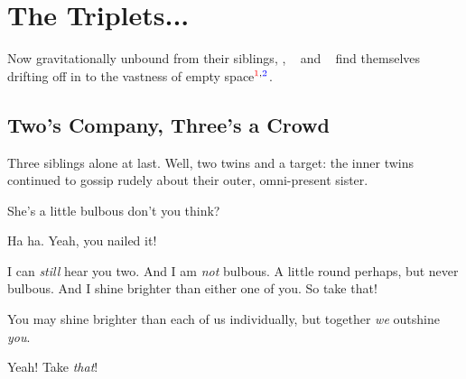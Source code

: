 \documentclass[main.tex]{subfiles}
\begin{document}
\chapter{The Triplets...}


 
\par \nar Now gravitationally unbound from their siblings, \rmtaygete, \rmalcyone~ and \rmcelaeno~ find themselves drifting off in to the vastness of empty space$^{\textcolor{red}{1},\textcolor{blue}{2}}$.  

\section{Two's Company, Three's a Crowd}

\par \nar Three siblings alone at last.  Well, two twins and a target: the inner twins continued to gossip rudely about their outer, omni-present sister.

\par \Taygete She's a little bulbous don't you think?

\par \Alcyone  Ha ha.  Yeah, you nailed it!

\par \Celaeno  I can \textit{still} hear you two.  And I am \textit{not} bulbous.  A little round perhaps, but never bulbous.  And I shine brighter than either one of you.  So take that!

\par \Alcyone You may shine brighter than each of us individually, but together \textit{we} outshine \textit{you}.  

\par \Taygete Yeah!  Take \textit{that}!
\end{document}

